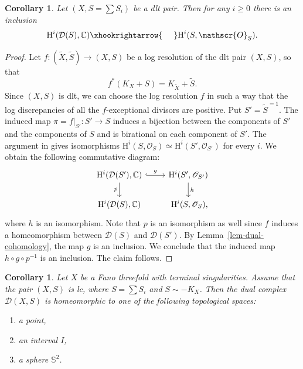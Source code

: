 \documentclass[11pt]{amsart}
\numberwithin{equation}{section}
\newtheorem{corollary}[thm]{Corollary}
\theoremstyle{definition}
\theoremstyle{remark}
\newcommand{\OOO}{\mathscr{O}}
\begin{document}
\begin{corollary}
\label{lem-dual-cohomology-dlt}
Let $(X, S = \sum S_i)$ be a dlt pair. Then for any $i\geq 0$ there is an inclusion
\[
\mathrm{H}^i (\mathcal{D}(S),\mathbb{C}) \xhookrightarrow{\hphantom{0pt}} \mathrm{H}^i (S, \OOO_S).
\]
\end{corollary}
\begin{proof}

Let $f\colon (\widetilde{X}, \widetilde{S})\to (X, S)$ be a log resolution of the dlt pair $(X, S)$, so that 
\[
f^*(K_X+S)=K_{\widetilde{X}}+\widetilde{S}.
\] 
Since $(X, S)$ is dlt, we can choose the log resolution $f$ in such a way that the log discrepancies of all the $f$-exceptional divisors are positive. Put $S'=\widetilde{S}^{=1}$. 
The induced map $\pi=f|_{S'}\colon S'\to S$ induces a bijection between the components of $S'$ and the components of $S$ and is birational on each component of $S'$. 
The argument in \cite[proof of Theorem~59(1)]{KX16} gives isomorphisms
$
\mathrm{H}^i(S,\OOO_S)\simeq\mathrm{H}^i(S',\OOO_{S'})
$
for every $i$.
We obtain the following commutative diagram:
\begin{equation}
\begin{tikzcd}
\mathrm{H}^i (\mathcal{D}(S'),\mathbb{C}) \arrow[hookrightarrow]{r}{g} \arrow[swap]{d}{p} & \mathrm{H}^i (S', \OOO_{S'}) \arrow{d}{h}\\
\mathrm{H}^i (\mathcal{D}(S),\mathbb{C})&  \mathrm{H}^i (S, \OOO_S)\rlap{,} 
\end{tikzcd}
\end{equation}
where $h$ is an isomorphism. Note that $p$ is an isomorphism as well since
$f$ induces a homeomorphism between $\mathcal{D}(S)$ and $\mathcal{D}(S')$. 
By Lemma~\ref{lem-dual-cohomology}, the map $g$ is an inclusion. We conclude that the induced map $h\circ g \circ p^{-1}$ is an inclusion. The claim follows. 
\end{proof}

\begin{corollary} 
\label{not-a-circle}
Let $X$ be a Fano threefold with terminal singularities.
Assume that the pair $(X, S)$ is lc, where $S=\sum S_i$ and $S\sim -K_X$. Then the dual complex $\mathcal{D}(X, S)$ is homeomorphic to one of the following topological spaces:
\begin{enumerate}
\item
a point,
\item
an interval $I$,
\item
a sphere $\mathbb{S}^2$.
\end{enumerate}
\end{corollary}
\end{document}
